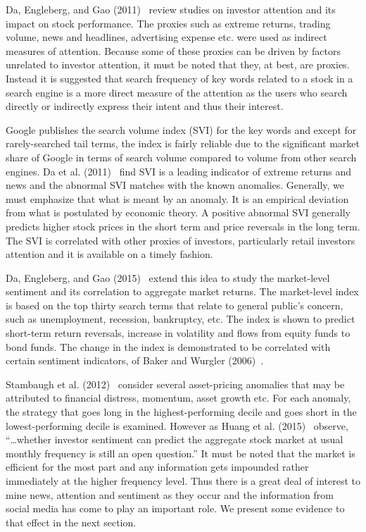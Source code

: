 Da, Engleberg, and Gao (2011)~\cite{da2011search} review studies on investor attention and its impact on stock performance. The proxies such as extreme returns, trading volume, news and headlines, advertising expense etc. were used as indirect measures of attention. Because some of these proxies can be driven by factors unrelated to investor attention, it must be noted that they, at best, are proxies. Instead it is suggested that search frequency of key words related to a stock in a search engine is a more direct measure of the attention as the users who search directly or indirectly express their intent and thus their interest.


Google publishes the search volume index (SVI) for the key words and except for rarely-searched tail terms, the index is fairly reliable due to the significant market share of Google in terms of search volume compared to volume from other search engines. Da et al. (2011)~\cite{da2011search} find SVI is a leading indicator of extreme returns and news and the abnormal SVI matches with the known anomalies. Generally, we must emphasize that what is meant by an anomaly. It is an empirical deviation from what is postulated by economic theory. A positive abnormal SVI generally predicts higher stock prices in the short term and price reversals in the long term. The SVI is correlated with other proxies of investors, particularly retail investors attention and it is available on a timely fashion. 


Da, Engleberg, and Gao (2015)~\cite{da2015sum} extend this idea to study the market-level sentiment and its correlation to aggregate market returns. The market-level index is based on the top thirty search terms that relate to general public's concern, such as unemployment, recession, bankruptcy, etc. The index is shown to predict short-term return reversals, increase in volatility and flows from equity funds to bond funds. The change in the index is demonstrated to be correlated with certain sentiment indicators, of Baker and Wurgler (2006)~\cite{baker2006investor}.


Stambaugh et al. (2012)~\cite{stamb} consider several asset-pricing anomalies that may be attributed to financial distress, momentum, asset growth etc. For each anomaly, the strategy that goes long in the highest-performing decile and goes short in the lowest-performing decile is examined. However as Huang et al. (2015)~\cite{huang} observe, ``\dots whether investor sentiment can predict the aggregate stock market at usual monthly frequency is still an open question.'' It must be noted that the market is efficient for the most part and any information gets impounded rather immediately at the higher frequency level. Thus there is a great deal of interest to mine news, attention and sentiment as they occur and the information from social media has come to play an important role. We present some evidence to that effect in the next section. 



